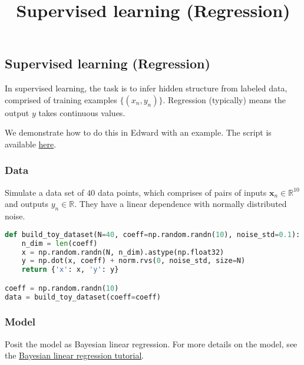 \title{Supervised learning (Regression)}

\subsection{Supervised learning (Regression)}

In supervised learning, the task is to infer hidden structure from
labeled data, comprised of training examples $\{(x_n, y_n)\}$.
Regression (typically) means the output $y$ takes continuous values.

We demonstrate how to do this in Edward with an example.
The script is available
\href{https://github.com/blei-lab/edward/blob/master/examples/bayesian_linear_regression_test.py}
{here}.


\subsubsection{Data}

Simulate a data set of $40$ data points, which comprises of pairs of inputs $\mathbf{x}_n\in\mathbb{R}^{10}$ and outputs
$y_n\in\mathbb{R}$. They have a linear dependence with normally distributed noise.

\begin{lstlisting}[language=Python]
def build_toy_dataset(N=40, coeff=np.random.randn(10), noise_std=0.1):
    n_dim = len(coeff)
    x = np.random.randn(N, n_dim).astype(np.float32)
    y = np.dot(x, coeff) + norm.rvs(0, noise_std, size=N)
    return {'x': x, 'y': y}

coeff = np.random.randn(10)
data = build_toy_dataset(coeff=coeff)
\end{lstlisting}


\subsubsection{Model}

Posit the model as Bayesian linear regression. For more details on the
model, see the
\href{tut_bayesian_linear_regression.html}
{Bayesian linear regression tutorial}.

